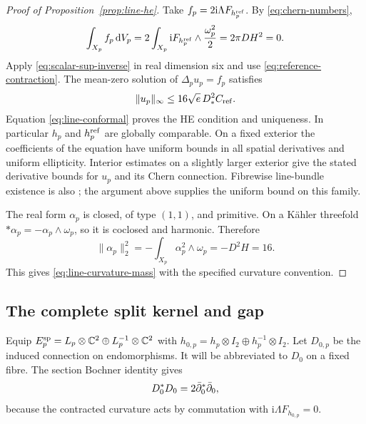 \begin{proof}[Proof of Proposition~\ref{prop:line-he}]
Take $f_p=2\mathrm i\Lambda F_{h_p^{\rm ref}}$.
By \eqref{eq:chern-numbers},
\[
 \int_{X_p} f_p\,\mathrm d V_p
 =2\int_{X_p}\mathrm iF_{h_p^{\rm ref}}\wedge\frac{\omega_p^2}{2}
 =2\pi DH^2=0.
\]
Apply \eqref{eq:scalar-sup-inverse} in real dimension six
and use \eqref{eq:reference-contraction}. The mean-zero
solution of $\Delta_pu_p=f_p$ satisfies
\[
 \|u_p\|_\infty\le16\sqrt e\,D_*^2C_{\rm ref}.
\]
Equation \eqref{eq:line-conformal} proves the HE condition
and uniqueness. In particular $h_p$ and $h_p^{\rm ref}$ are
globally comparable. On a fixed exterior the coefficients
of the equation have uniform bounds in all spatial derivatives
and uniform ellipticity. Interior estimates on a slightly
larger exterior give the stated derivative bounds for
$u_p$ and its Chern connection. Fibrewise line-bundle
existence is also \cite[Proposition 4.2.4]{Kobayashi}; the
argument above supplies the uniform bound on this family.

The real form $\alpha_p$ is closed, of type $(1,1)$, and
primitive. On a Kähler threefold $*\alpha_p=-\alpha_p\wedge\omega_p$,
so it is coclosed and harmonic. Therefore
\[
 \|\alpha_p\|_2^2=-\int_{X_p}\alpha_p^2\wedge\omega_p
                            =-D^2H=16.
\]
This gives \eqref{eq:line-curvature-mass} with the specified
curvature convention.
\end{proof}

\subsection{The complete split kernel and gap}

Equip $E^{\rm sp}_p=L_p\otimes\mathbb C^2\oplus L_p^{-1}\otimes\mathbb C^2$
with $h_{0,p}=h_p\otimes I_2\oplus h_p^{-1}\otimes I_2$.
Let $D_{0,p}$ be the induced connection on endomorphisms.
It will be abbreviated to $D_0$ on a fixed fibre.
The section Bochner identity
\cite[Chapter VII, Corollary 1.3]{Demailly} gives
\begin{equation}\label{eq:split-bochner}
 D_0^*D_0=2\bar\partial_0^*\bar\partial_0,
\end{equation}
because the contracted curvature acts by commutation with
$\mathrm i\Lambda F_{h_{0,p}}=0$.

